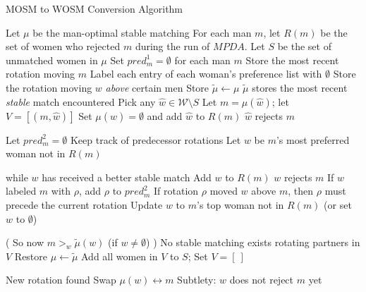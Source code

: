 \documentclass[12pt]{article}
\newcommand{\M}{\mathcal{M}}
\newcommand{\W}{\mathcal{W}}
\begin{document}
  \begin{algorithm}
    \caption{MOSM to WOSM Conversion Algorithm}\label{algMosmToWosm}
  \begin{algorithmic}[1]
    \State Let $\mu$ be the man-optimal stable matching
    \State For each man $m$, let $R(m)$ be the set of women who rejected $m$
    during the run of $MPDA$.
    \State Let $S$ be the set of unmatched women in $\mu$
    \State Set $pred^1_m = \emptyset$ for each man $m$
      \Comment Store the most recent rotation moving $m$
    \State Label each entry of each woman's preference list with $\emptyset$
      \Comment Store the rotation moving $w$ \emph{above} certain men
    \While { $S \ne \W$ }
      \State Store $\tilde\mu \leftarrow \mu$
      \Comment $\tilde\mu$ stores the most recent \emph{stable} match encountered
      \State Pick any $\hat w\in \W\setminus S$
      \State Let $m = \mu(\hat w)$; let $V = [ (m, \hat w) ]$
      \State Set $\mu(\hat w) = \emptyset$ and add $\hat w$ to $R(m)$
        \Comment $\hat w$ rejects $m$

        \State Let $pred_{m}^2 = \emptyset$
          \Comment Keep track of predecessor rotations
        \State Let $w$ be $m$'s most preferred woman not in $R(m)$

          \Comment while $w$ has received a better stable match
          \State Add $w$ to $R(m)$
          \Comment $w$ rejects $m$
          \State If $w$ labeled $m$ with $\rho$, add $\rho$ to $pred_m^2$
          \State \Comment If rotation $\rho$ moved 
            $w$ above $m$, then $\rho$ must precede the current rotation
          \State Update $w$ to $m$'s top woman not in $R(m)$ (or set $w$ to $\emptyset$)
        \EndWhile

        \State ( So now $m >_w \tilde\mu(w)$ (if $w\ne \emptyset$) )
        \label{lineFirstDeciciveCase}
          \Comment No stable matching exists rotating partners in $V$
          \State Restore $\mu \leftarrow \tilde\mu$
          \State Add all women in $V$ to $S$; Set $V = [\ ]$

          \Comment New rotation found
            \State Swap $\mu(w) \leftrightarrow m$
            \Comment Subtlety: $w$ does not reject $m$ yet
          \EndIf
          \State {}


\end{algorithmic}
\end{algorithm}
\end{document}
